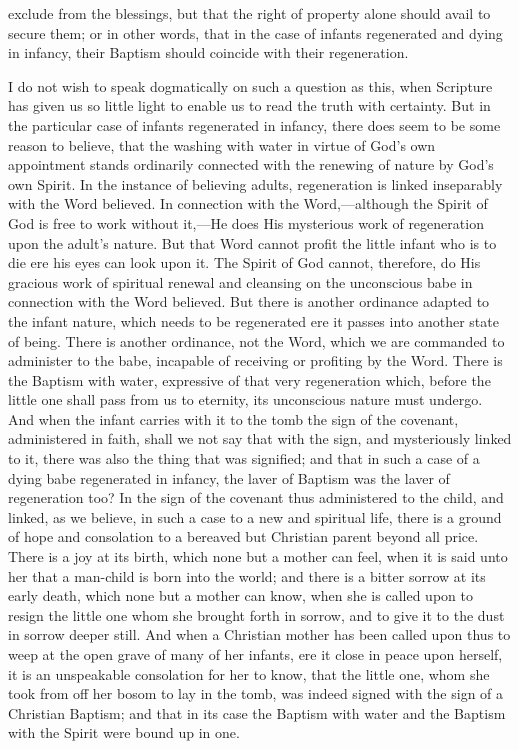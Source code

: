 \documentclass[]{book}
\begin{document}
exclude from the blessings, but that the right of property alone should avail to secure them; or in other words, that in the case of infants regenerated and dying in infancy, their Baptism should coincide with their regeneration.

I do not wish to speak dogmatically on such a question as this, when Scripture has given us so little light to enable us to read the truth with certainty. But in the particular case of infants regenerated in infancy, there does seem to be some reason to believe, that the washing with water in virtue of God's own appointment stands ordinarily connected with the renewing of nature by God's own Spirit. In the instance of believing adults, regeneration is linked inseparably with the Word believed. In connection with the Word,---although the Spirit of God is free to work without it,---He does His mysterious work of regeneration upon the adult's nature. But that Word cannot profit the little infant who is to die ere his eyes can look upon it. The Spirit of God cannot, therefore, do His gracious work of spiritual renewal and cleansing on the unconscious babe in connection with the Word believed. But there is another ordinance adapted to the infant nature, which needs to be regenerated ere it passes into another state of being. There is another ordinance, not the Word, which we are commanded to administer to the babe, incapable of receiving or profiting by the Word. There is the Baptism with water, expressive of that very regeneration which, before the little one shall pass from us to eternity, its unconscious nature must undergo. And when the infant carries with it to the tomb the sign of the covenant, administered in faith, shall we not say that with the sign, and mysteriously linked to it, there was also the thing that was signified; and that in such a case of a dying babe regenerated in infancy, the laver of Baptism was the laver of regeneration too? In the sign of the covenant thus administered to the child, and linked, as we believe, in such a case to a new and spiritual life, there is a ground of hope and consolation to a bereaved but Christian parent beyond all price. There is a joy at its birth, which none but a mother can feel, when it is said unto her that a man-child is born into the world; and there is a bitter sorrow at its early death, which none but a mother can know, when she is called upon to resign the little one whom she brought forth in sorrow, and to give it to the dust in sorrow deeper still. And when a Christian mother has been called upon thus to weep at the open grave of many of her infants, ere it close in peace upon herself, it is an unspeakable consolation for her to know, that the little one, whom she took from off her bosom to lay in the tomb, was indeed signed with the sign of a Christian Baptism; and that in its case the Baptism with water and the Baptism with the Spirit were bound up in one.
\end{document}
